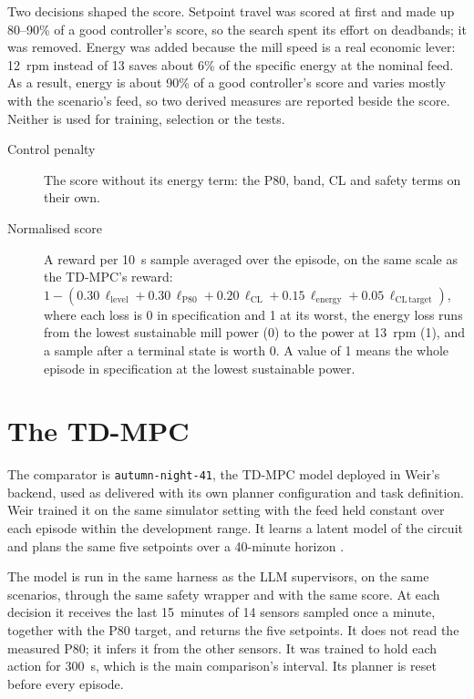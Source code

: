 Two decisions shaped the score. Setpoint travel was scored at first and made
up 80--90\% of a good controller's score, so the search spent its effort on
deadbands; it was removed. Energy was added because the mill speed is a real
economic lever: 12~rpm instead of 13 saves about 6\% of the specific energy at
the nominal feed. As a result, energy is about 90\% of a good controller's
score and varies mostly with the scenario's feed, so two derived measures are
reported beside the score. Neither is used for training, selection or the
tests.
\begin{description}
\item[Control penalty] The score without its energy term: the P80, band, CL
  and safety terms on their own.
\item[Normalised score] A reward per 10~s sample averaged over the episode, on
  the same scale as the TD-MPC's reward: $1 - (0.30\,\ell_{\mathrm{level}} +
  0.30\,\ell_{\mathrm{P80}} + 0.20\,\ell_{\mathrm{CL}} + 0.15\,\ell_{\mathrm{energy}}
  + 0.05\,\ell_{\mathrm{CL\,target}})$, where each loss is 0 in specification
  and 1 at its worst, the energy loss runs from the lowest sustainable mill
  power (0) to the power at 13~rpm (1), and a sample after a terminal state is
  worth 0. A value of 1 means the whole episode in specification at the lowest
  sustainable power.
\end{description}

\section{The TD-MPC}
\label{sec:mill-tdmpc}
The comparator is \texttt{autumn-night-41}, the TD-MPC model deployed in
Weir's backend, used as delivered with its own planner configuration and task
definition. Weir trained it on the same simulator setting with the feed held
constant over each episode within the development range. It learns a latent
model of the circuit and plans the same five setpoints over a 40-minute
horizon \cite{hansen2022tdmpc}.

The model is run in the same
harness as the LLM supervisors, on the same scenarios, through the same safety
wrapper and with the same score. At each decision it receives the last
15~minutes of 14 sensors sampled once a minute, together with the P80 target,
and returns the five setpoints. It does not read the measured P80; it infers
it from the other sensors. It was trained to hold each action for 300~s, which
is the main comparison's interval. Its planner is reset before every episode.


